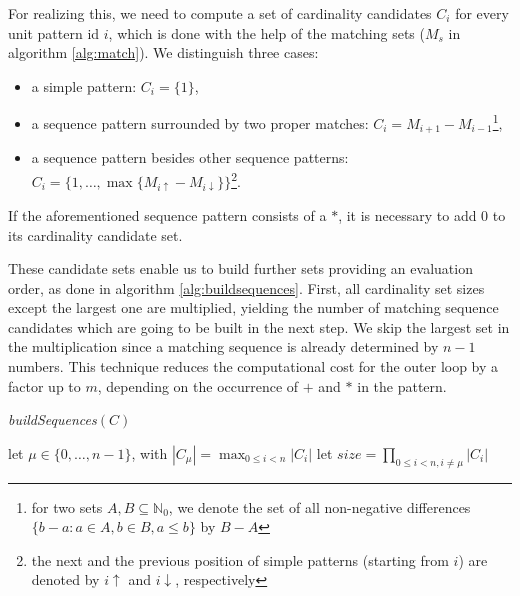 \documentclass{sig-alternate}
\newcommand{\ic}[1]{\textit{#1}}
\begin{document}
For realizing this, we need to compute a set of cardinality candidates $C_i$ for every unit pattern id $i$, which is done with the help of the matching sets ($M_s$ in algorithm \ref{alg:match}). We distinguish three cases:
\begin{itemize}
  \item a simple pattern: $C_i=\{1\}$,
  \item a sequence pattern surrounded by two proper matches: $C_i=M_{i+1}-M_{i-1}$\footnote{for two sets $A, B\subseteq \mathbb{N}_0$, we denote the set of all non-negative differences $\{b-a\colon a\in A, b\in B, a\leq b\}$ by $B-A$},
  \item a sequence pattern besides other sequence patterns: $C_{i}=\{1,\dots,\max\{M_{i\uparrow}-M_{i\downarrow}\}\}$\footnote{the next and the previous position of simple patterns (starting from $i$) are denoted by $i\!\uparrow$ and $i\!\downarrow$, respectively}.
\end{itemize}

If the aforementioned sequence pattern consists of a $\ast$, it is necessary to add $0$ to its cardinality candidate set.

These candidate sets enable us to build further sets providing an evaluation order, as done in algorithm \ref{alg:buildsequences}. First, all cardinality set sizes except the largest one are multiplied, yielding the number of matching sequence candidates which are going to be built in the next step. We skip the largest set in the multiplication since a matching sequence is already determined by $n-1$ numbers. This technique reduces the computational cost for the outer loop by a factor up to $m$, depending on the occurrence of $+$ and $\ast$ in the pattern.

\begin{algorithm}[ht]
  \caption{\label{alg:buildsequences}\ic{buildSequences$(C)$}}
    let $\mu\in \{0,\dots,n-1\}$, with $\left|C_\mu\right|=\max_{0\leq i<n} \left|C_i\right|$\;
    let $size=\prod_{0\leq i<n,i\neq\mu}\left|C_i\right|$\;
\end{algorithm}
\end{document}
